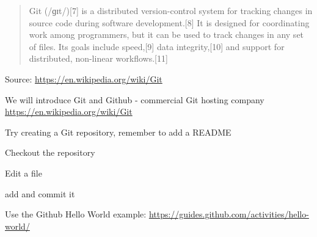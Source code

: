 \documentclass[Screen16to9,17pt]{foils}
\begin{document}

\begin{quote}
Git (/ɡɪt/)[7] is a distributed version-control system for tracking changes in source code during software development.[8] It is designed for coordinating work among programmers, but it can be used to track changes in any set of files. Its goals include speed,[9] data integrity,[10] and support for distributed, non-linear workflows.[11]
\end{quote}

Source: \url{https://en.wikipedia.org/wiki/Git}

\begin{list2}
\item We will introduce Git and Github - commercial Git hosting company\\
\url{https://en.wikipedia.org/wiki/Git}
\item Try creating a Git repository, remember to add a README
\item Checkout the repository
\item Edit a file
\item add and commit it
\end{list2}

Use the Github Hello World example: \url{https://guides.github.com/activities/hello-world/}


\slidenext
\end{document}
